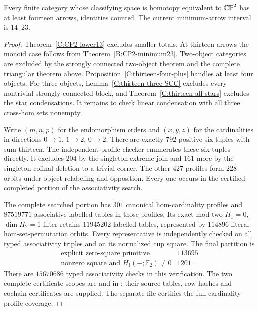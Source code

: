 \begin{theorem}\label{C:CP2-lower14}
Every finite category whose classifying space is homotopy
equivalent to $\mathbb {CP}^2$ has at least fourteen arrows, identities
counted.  The current minimum-arrow interval is $14$--$23$.
\end{theorem}
\begin{proof}
Theorem~\ref{C:CP2-lower13} excludes smaller totals.  At thirteen
arrows the monoid case follows from Theorem~\ref{B:CP2-minimum23}.
Two-object categories are excluded by the strongly connected
two-object theorem and the complete triangular theorem above.
Proposition~\ref{C:thirteen-four-plus} handles at least four objects.
For three objects, Lemma~\ref{C:thirteen-three-SCC} excludes every
nontrivial strongly connected block, and
Theorem~\ref{C:thirteen-all-stars} excludes the star condensations.
It remains to check linear condensation with all three cross-hom
sets nonempty.

Write $(m,n,p)$ for the endomorphism orders and $(x,y,z)$ for
the cardinalities in directions $0\to1$, $1\to2$, $0\to2$.
There are exactly $792$ positive six-tuples with sum thirteen.
The independent profile checker
 enumerates these
six-tuples directly.  It excludes $204$ by the singleton-extreme
join and $161$ more by the singleton cofinal deletion to a trivial
corner.  The other $427$ profiles form $228$ orbits under object
relabeling and opposition.  Every one occurs in the certified
completed portion of the associativity search.

The complete searched portion has $301$ canonical hom-cardinality
profiles and $87519771$ associative labelled tables in those
profiles.  Its exact mod-two $H_1=0$, $\dim H_2=1$ filter retains
$11945202$ labelled tables, represented by $114896$ literal
hom-set-permutation orbits.  Every representative is independently
checked on all typed associativity triples and on its normalized
cup square.  The final partition is
\[
 \begin{array}{c|r}
 \text{explicit zero-square primitive}&113695\\
 \text{nonzero square and }H_3(-;\mathbb F_2)\ne0&1201.
 \end{array}
\]
There are $15670686$ typed associativity checks in this verification.
The two complete certificate scopes are
and 
in ; their source tables, row hashes and
cochain certificates are supplied.  The separate file
 certifies
the full cardinality-profile coverage.


\end{proof}

